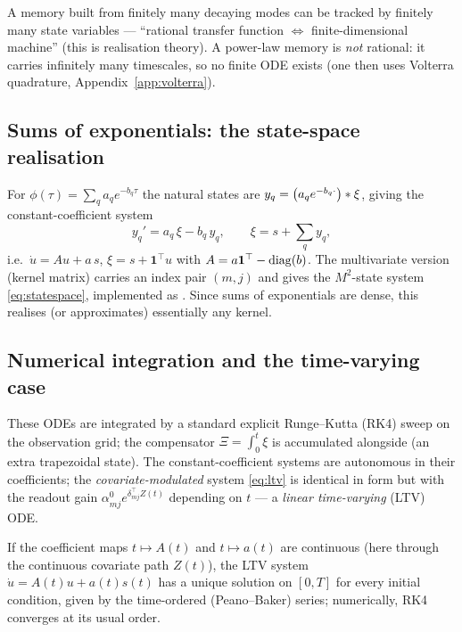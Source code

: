 \begin{intuition}
A memory built from finitely many decaying modes can be tracked by finitely many
state variables --- ``rational transfer function $\Leftrightarrow$
finite-dimensional machine'' (this is realisation theory). A power-law memory is
\emph{not} rational: it carries infinitely many timescales, so no finite ODE exists
(one then uses Volterra quadrature, Appendix~\ref{app:volterra}).
\end{intuition}

\subsection{Sums of exponentials: the state-space realisation}

For $\phi(\tau)=\sum_q a_q e^{-b_q\tau}$ the natural states are
$y_q=\bigl(a_q e^{-b_q\cdot}\bigr)\ast\xi$, giving the constant-coefficient system
\begin{equation}
y_q'=a_q\,\xi-b_q\,y_q,\qquad \xi=s+\sum_q y_q,
\end{equation}
i.e.\ $\dot u=Au+a\,s$, $\xi=s+\mathbf 1^\top u$ with $A=a\mathbf 1^\top-\operatorname{diag}(b)$.
The multivariate version (kernel matrix) carries an index pair $(m,j)$ and gives the
$M^2$-state system \eqref{eq:statespace}, implemented as
. Since sums of exponentials are dense, this
realises (or approximates) essentially any kernel.

\subsection{Numerical integration and the time-varying case}

These ODEs are integrated by a standard explicit Runge--Kutta (RK4) sweep on the
observation grid; the compensator $\Xi=\int_0^t\xi$ is accumulated alongside (an
extra trapezoidal state). The constant-coefficient systems are autonomous in their
coefficients; the \emph{covariate-modulated} system \eqref{eq:ltv} is identical in
form but with the readout gain $\alpha^0_{mj}e^{\delta_{mj}^\top Z(t)}$ depending on
$t$ --- a \emph{linear time-varying} (LTV) ODE.

\begin{proposition}
If the coefficient maps $t\mapsto A(t)$ and $t\mapsto a(t)$ are continuous (here
through the continuous covariate path $Z(t)$), the LTV system $\dot u=A(t)u+a(t)s(t)$
has a unique solution on $[0,T]$ for every initial condition, given by the
time-ordered (Peano--Baker) series; numerically, RK4 converges at its usual order.
\end{proposition}

